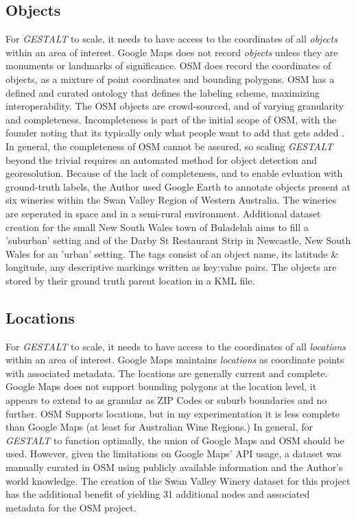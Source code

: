 \subsection{Objects}
For \textit{GESTALT} to scale, it needs to have access to the coordinates of all \textit{objects} within an area of interest. 
Google Maps does not record \textit{objects} unless they are monuments or landmarks of significance. 
OSM does record the coordinates of objects, as a mixture of point coordinates and bounding polygons. 
OSM has a defined and curated ontology that defines the labeling scheme, maximizing interoperability. 
The OSM objects are crowd-sourced, and of varying granularity and completeness. Incompleteness is part of the initial scope of OSM, with the founder noting that its typically only what people want to add that gets added \cite{Haklay2008}.
In general, the completeness of OSM cannot be assured, so scaling \textit{GESTALT} beyond the trivial requires an automated method for object detection and georesolution. 
Because of the lack of completeness, and to enable evluation with ground-truth labels, the Author used Google Earth to annotate objects present at six wineries within the Swan Valley Region of Western Australia. The wineries are seperated in space and in a semi-rural environment. Additional dataset creation for the small New South Wales town of Buladelah aims to fill a 'suburban' setting and of the Darby St Restaurant Strip in Newcastle, New South Wales for an 'urban' setting. The tags consist of an object name, its latitude \& longitude, any descriptive markings written as key:value pairs. The objects are stored by their ground truth parent location in a KML file. 


\subsection{Locations}
For \textit{GESTALT} to scale, it needs to have access to the coordinates of all \textit{locations} within an area of interest. 
Google Maps maintains \textit{locations} as coordinate points with associated metadata. The locations are generally current and complete. 
Google Maps does not support bounding polygons at the location level, it appears to extend to as granular as ZIP Codes or suburb boundaries and no further. 
OSM Supports locations, but in my experimentation it is less complete than Google Maps (at least for Australian Wine Regions.)
In general, for \textit{GESTALT} to function optimally, the union of Google Maps and OSM should be used. However, given the limitations on Google Maps' API usage, a dataset was manually curated in OSM using publicly available information and the Author's world knowledge. 
The creation of the Swan Valley Winery dataset for this project has the additional benefit of yielding 31 additional nodes and associated metadata for the OSM project. 

